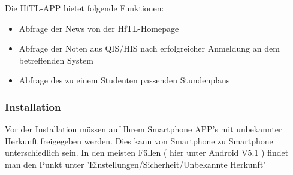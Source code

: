 Die HfTL-APP bietet folgende Funktionen:

\begin{itemize}
\item Abfrage der News von der HfTL-Homepage
\item Abfrage der Noten aus QIS/HIS nach erfolgreicher Anmeldung an dem betreffenden System
\item Abfrage des zu einem Studenten passenden Stundenplans
\end{itemize}

\newpage

\subsubsection{Installation}

Vor der Installation müssen auf Ihrem Smartphone APP's mit unbekannter Herkunft freigegeben werden. Dies kann von Smartphone zu Smartphone unterschiedlich sein. In den meisten Fällen ( hier unter Android V5.1 ) findet man den Punkt unter 'Einstellungen/Sicherheit/Unbekannte Herkunft'

